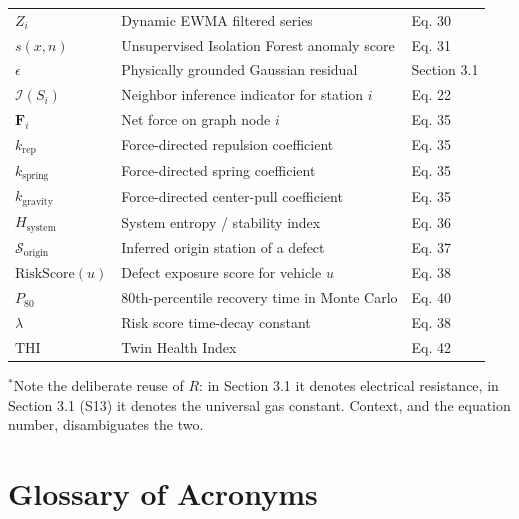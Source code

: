 \documentclass[11pt]{article}
\begin{document}
\begin{center}
\begin{longtable}{p{2.6cm}p{6.6cm}p{2.5cm}}
$Z_i$ & Dynamic EWMA filtered series & Eq. 30 \\
$s(x, n)$ & Unsupervised Isolation Forest anomaly score & Eq. 31 \\
$\epsilon$ & Physically grounded Gaussian residual & Section 3.1 \\
$\mathcal{I}(S_i)$ & Neighbor inference indicator for station $i$ & Eq. 22 \\
$\mathbf{F}_i$ & Net force on graph node $i$ & Eq. 35 \\
$k_{\text{rep}}$ & Force-directed repulsion coefficient & Eq. 35 \\
$k_{\text{spring}}$ & Force-directed spring coefficient & Eq. 35 \\
$k_{\text{gravity}}$ & Force-directed center-pull coefficient & Eq. 35 \\
$H_{\text{system}}$ & System entropy / stability index & Eq. 36 \\
$\mathcal{S}_{\text{origin}}$ & Inferred origin station of a defect & Eq. 37 \\
$\text{RiskScore}(u)$ & Defect exposure score for vehicle $u$ & Eq. 38 \\
$P_{80}$ & 80th-percentile recovery time in Monte Carlo & Eq. 40 \\
$\lambda$ & Risk score time-decay constant & Eq. 38 \\
$\text{THI}$ & Twin Health Index & Eq. 42 \\
\bottomrule
\end{longtable}
{\footnotesize $^{\ast}$Note the deliberate reuse of $R$: in Section 3.1 it denotes electrical resistance, in Section 3.1 (S13) it denotes the universal gas constant. Context, and the equation number, disambiguates the two.}
\end{center}

\section{Glossary of Acronyms}
\end{document}
